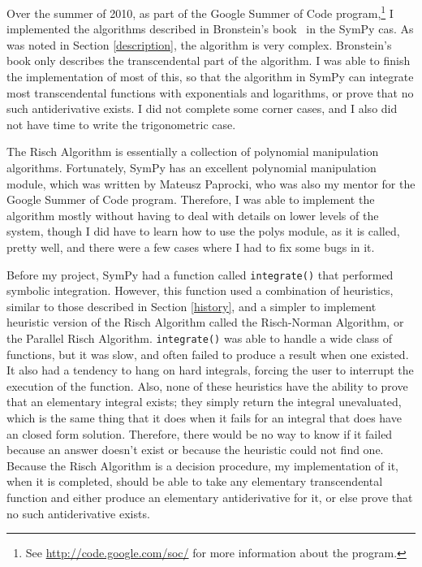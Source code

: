 Over the summer of 2010, as part of the Google Summer of Code
program,\footnote{ See \url{http://code.google.com/soc/} for more
information about the program.} I implemented the algorithms described
in Bronstein's book~\cite{bronstein2005symbolic} in the SymPy \gls{cas}.
As was noted in Section \ref{description}, the algorithm is very
complex. Bronstein's book only describes the \gls{transcendental} part
of the algorithm. I was able to finish the implementation of most of
this, so that the algorithm in SymPy can integrate most
\gls{transcendental} functions with exponentials and logarithms, or
prove that no such antiderivative exists.  I did not complete some
corner cases, and I also did not have time to write the trigonometric
case.

The Risch Algorithm is essentially a collection of polynomial
manipulation algorithms.  Fortunately, SymPy has an excellent polynomial
manipulation module, which was written by Mateusz Paprocki, who was also
my mentor for the Google Summer of Code program.  Therefore, I was able
to implement the algorithm mostly without having to deal with details on
lower levels of the system, though I did have to learn how to use the
polys module, as it is called, pretty well, and there were a few cases
where I had to fix some bugs in it.

Before my project, SymPy had a function called \texttt{integrate()} that
performed symbolic integration.  However, this function used a
combination of heuristics, similar to those described in Section
\ref{history}, and a simpler to implement heuristic version of the Risch
Algorithm called the Risch-Norman Algorithm, or the Parallel Risch
Algorithm.  \texttt{integrate()} was able to handle a wide class of
functions, but it was slow, and often failed to produce a result when
one existed.  It also had a tendency to hang on hard integrals, forcing
the user to interrupt the execution of the function.  Also, none of
these heuristics have the ability to prove that an \gls{elementary}
integral exists; they simply return the integral unevaluated, which is
the same thing that it does when it fails for an integral that does have
an closed form solution. Therefore, there  would be no way to know if it
failed because an answer doesn't exist or because the heuristic could
not find one.  Because the Risch Algorithm is a decision procedure,
my implementation of it, when it is completed, should be able to take any
\gls{elementary} \gls{transcendental} function and either produce an
\gls{elementary} antiderivative for it, or else prove that no such
antiderivative exists.  

